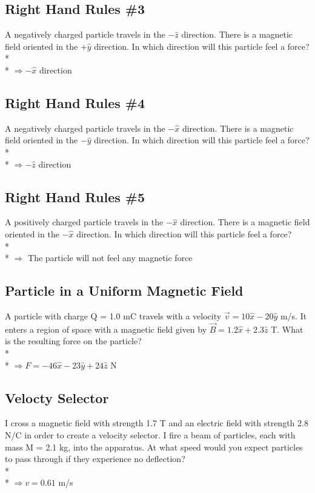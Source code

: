 \documentclass[11pt]{article}
\begin{document}
\subsection{Right Hand Rules \#3}
A negatively charged particle travels in the $-\hat{z}$ direction.  There is a magnetic field oriented in the $+\hat{y}$ direction.  In which direction will this particle feel a force? \\* \\*
$\Rightarrow -\hat{x}$ direction

\subsection{Right Hand Rules \#4}
A negatively charged particle travels in the $-\hat{x}$ direction.  There is a magnetic field oriented in the $-\hat{y}$ direction.  In which direction will this particle feel a force? \\* \\*
$\Rightarrow -\hat{z}$ direction

\subsection{Right Hand Rules \#5}
A positively charged particle travels in the $-\hat{x}$ direction.  There is a magnetic field oriented in the $-\hat{x}$ direction.  In which direction will this particle feel a force? \\* \\*
$\Rightarrow$ The particle will not feel any magnetic force

\subsection{Particle in a Uniform Magnetic Field}
A particle with charge Q = 1.0 mC travels with a velocity $\vec{v} = 10 \hat{x} - 20 \hat{y}$ m/s.  It enters a region of space with a magnetic field given by $\vec{B} = 1.2 \hat{x} + 2.3 \hat{z}$ T.  What is the resulting force on the particle? \\* \\*
$\Rightarrow F = -46\hat{x} - 23\hat{y} + 24\hat{z}$ N

\pagebreak
\subsection{Velocty Selector}
I cross a magnetic field with strength 1.7 T and an electric field with strength 2.8 N/C in order to create a velocity selector.  I fire a beam of particles, each with mass M = 2.1 kg, into the apparatus.  At what speed would you expect particles to pass through if they experience no deflection? \\* \\*
$\Rightarrow v = 0.61$ m/s
\end{document}
